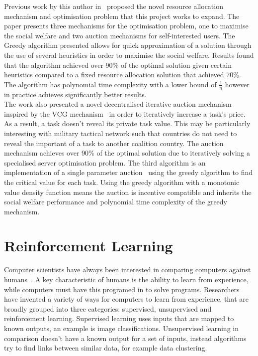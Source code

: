 Previous work by this author in~\cite{FlexibleResourceAllocation} proposed the novel resource allocation mechanism and
optimisation problem that this project works to expand. The paper presents three mechanisms for the optimisation problem,
one to maximise the social welfare and two auction mechanisms for self-interested users. The Greedy algorithm presented
allows for quick approximation of a solution through the use of several heuristics in order to maximise the social
welfare. Results found that the algorithm achieved over 90\% of the optimal solution given certain heuristics compared
to a fixed resource allocation solution that achieved 70\%. The algorithm has polynomial time complexity with a lower
bound of $\frac{1}{n}$ however in practice achieves significantly better results. \\
The work also presented a novel decentralised iterative auction mechanism inspired by the VCG
mechanism~\citep{vickrey, Clarke, groves} in order to iteratively increase a task's price. As a result, a task doesn't
reveal its private task value. This may be particularly interesting with military tactical network such that countries
do not need to reveal the important of a task to another coalition country. The auction mechanism achieves over 90\% of
the optimal solution due to iteratively solving a specialised server optimisation problem. The third algorithm is an
implementation of a single parameter auction~\citep{nisan2007algorithmic_critical_value} using the greedy algorithm to
find the critical value for each task. Using the greedy algorithm with a monotonic value density function means the
auction is incentive compatible and inherits the social welfare performance and polynomial time complexity of the
greedy mechanism.

\section{Reinforcement Learning}\label{sec:reinforcement-learning}
Computer scientists have always been interested in comparing computers against humans~\citep{turing1950computing}. A
key characteristic of humans is the ability to learn from experience, while computers must have this programed in to
solve programs. Researchers have invented a variety of ways for computers to learn from experience, that are broadly
grouped into three categories: supervised, unsupervised and reinforcement learning. Supervised learning uses inputs
that are mapped to known outputs, an example is image classifications. Unsupervised learning in comparison doesn't have
a known output for a set of inputs, instead algorithms try to find links between similar data, for example data
clustering.

